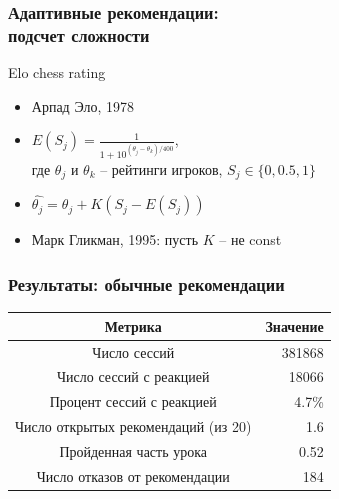 \documentclass{beamer}
\begin{document}
\begin{frame}\frametitle{Адаптивные рекомендации: \\подсчет сложности}
       Elo chess rating
       \medskip
       \begin{itemize}
            \item Арпад Эло, 1978\cite{elo1978rating}
            \medskip
            \item $E(S_j) = \frac{1}{1 + 10 ^ {(\theta_j - \theta_k) / 400}}$, \\где $\theta_j$ и $\theta_k$ -- рейтинги игроков, $S_j \in \{0, 0.5, 1\}$
            \medskip
            \item $\hat{\theta_j} = \theta_j + K(S_j - E(S_j))$
            \medskip
            \item Марк Гликман, 1995: пусть $K$ -- не const \cite{glickman95}
      \end{itemize}
\end{frame}



\begin{frame}\frametitle{Результаты: обычные рекомендации}
\bigskip

\begin{table}[H]
    \begin{tabular}{| c || r| }
      Метрика & Значение \\
      \hline		
      Число сессий & 381868 \\
      Число сессий с реакцией & 18066 \\
      Процент сессий с реакцией &  4.7\% \\
      Число открытых рекомендаций (из 20) & 1.6 \\
      Пройденная часть урока & 0.52 \\
      Число отказов от рекомендации & 184 \\\hline
    \end{tabular}
\end{table}


\begin{figure}[H]
  \centering
  \hfill
\end{figure}

\end{frame}
\end{document}
